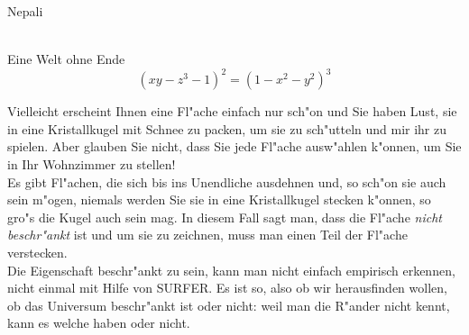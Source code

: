 \documentclass[de]{./../../common/SurferDesc}%
\begin{document}
\footnotesize

\begin{surferPage}
  \begin{surferTitle}Nepali\end{surferTitle}  \\
Eine Welt ohne Ende \\

\smallskip
\[(x y - z^3 -1)^2= (1 - x^2	- y^2)^3\]

\singlespacing
Vielleicht erscheint Ihnen eine Fl"ache einfach nur sch"on und Sie haben Lust, sie in eine Kristallkugel mit Schnee zu packen, um sie zu sch"utteln und mir ihr zu spielen. Aber glauben Sie nicht, dass Sie jede Fl"ache ausw"ahlen k"onnen, um Sie in Ihr Wohnzimmer zu stellen! \\
\singlespacing
Es gibt Fl"achen, die sich bis ins Unendliche ausdehnen und, so sch"on sie auch sein m"ogen, niemals werden Sie sie in eine Kristallkugel stecken k"onnen, so gro"s die Kugel auch sein mag. In diesem Fall sagt man, dass die Fl"ache \textit{nicht beschr"ankt} ist und um sie zu zeichnen, muss man einen Teil der Fl"ache verstecken. \\
\singlespacing
Die Eigenschaft beschr"ankt zu sein, kann man nicht einfach empirisch erkennen, nicht einmal mit Hilfe von SURFER. Es ist so, also ob wir herausfinden wollen, ob das Universum beschr"ankt ist oder nicht: weil man die R"ander nicht kennt, kann es welche haben oder nicht.



  \begin{surferText}
     \end{surferText}
\end{surferPage}
\end{document}

